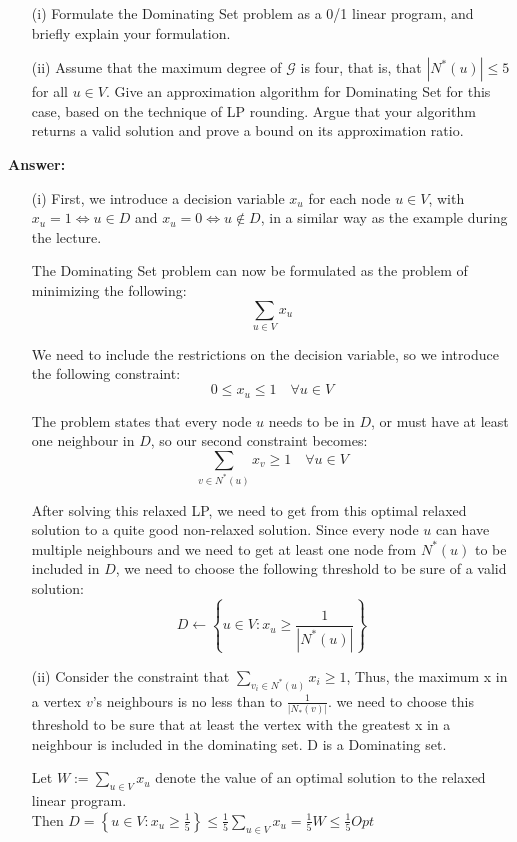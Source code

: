 \documentclass{article}
\newcommand{\G}{\ensuremath{\mathcal{G}}}
\newcommand{\graph}{\G}
\newcommand{\domset}{{\sc Dominating Set}\xspace}
\renewcommand{\leq}{\leqslant}
\renewcommand{\geq}{\geqslant}
\newcounter{rcounter}
\newenvironment{rlist}%
{\begin{list}{\setnr-\arabic{rcounter}}{\usecounter{rcounter}}}{\end{list}}
\begin{document}
\begin{rlist}
        \begin{enumerate}
            \item[(i)]
            Formulate the \domset problem as a 0/1 linear program, and briefly explain your formulation.
            \item[(ii)]
            Assume that the maximum degree of $\graph$ is four, that is, that      $|N^*(u)|\leq 5$ for all $u\in V$. Give an approximation algorithm for \domset for this case, based on the technique of LP rounding. Argue that your algorithm returns a valid solution and prove a bound on its approximation ratio.
        \end{enumerate}
        
        \textbf{Answer:}
        \begin{enumerate}
            \item[(i)]
            First, we introduce a decision variable $x_u$ for each node $u \in V$, with $x_u = 1 \iff u \in D$ and $x_u = 0 \iff u \not\in D$, in a similar way as the example during the lecture.
            
            The \domset problem can now be formulated as the problem of minimizing the following:
            $$\sum_{u \in V} x_u$$
            
            We need to include the restrictions on the decision variable, so we introduce the following constraint:
            $$0 \leq x_u \leq 1 \quad \forall u \in V$$
            
            The problem states that every node $u$ needs to be in $D$, or must have at least one neighbour in $D$, so our second constraint becomes:
            $$\sum_{v \in N^*(u)}x_v \geq 1 \quad \forall u \in V$$
            
            After solving this relaxed LP, we need to get from this optimal relaxed solution to a quite good non-relaxed solution. Since every node $u$ can have multiple neighbours and we need to get at least one node from $N^*(u)$ to be included in $D$, we need to choose the following threshold to be sure of a valid solution:
            $$D \leftarrow \left\{u \in V : x_u \geq \frac{1}{|N^*(u)|}\right\}$$
            \item[(ii)]
            Consider the constraint that $\sum_{v_i \in N^*(u)}x_i \geq 1$, Thus, the maximum x in a vertex $v$'s neighbours is no less than to $\frac{1}{|N_*(v)|}$. we need to choose this threshold to be sure that at least the vertex with the greatest x in a neighbour is included in the dominating set. D is a Dominating set. 
            
            Let $W := \sum_{u \in V} x_u$ denote the value of an optimal solution to the relaxed linear program.
            \\Then $D = \left\{u \in V : x_u \geq \frac{1}{5}\right\} \leq \frac{1}{5}\sum_{u \in V} x_u = \frac{1}{5}W \leq \frac{1}{5}Opt $ 
        \end{enumerate}
    \end{rlist}
    
\end{document}
